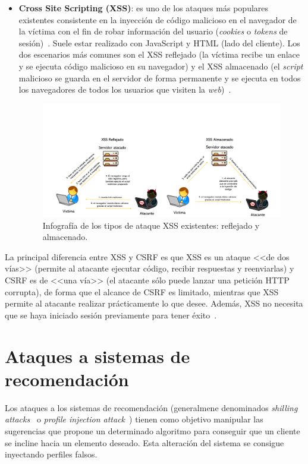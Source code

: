 \begin{itemize}
	\item \textbf{Cross Site Scripting (XSS)}: es uno de los ataques más populares existentes consistente en la inyección de código malicioso en el navegador de la víctima con el fin de robar información del usuario (\textit{cookies} o \textit{tokens} de sesión)~\cite{xssICM}. Suele estar realizado con JavaScript y HTML (lado del cliente). Los dos escenarios más comunes son el XSS reflejado (la víctima recibe un enlace y se ejecuta código malicioso en su navegador) y el XSS almacenado (el \textit{script} malicioso se guarda en el servidor de forma permanente y se ejecuta en todos los navegadores de todos los usuarios que visiten la \textit{web})~\cite{xssDibus}.
	
	\begin{figure}[h]
		\caption[Ataques \textit{web}: XSS]{Infografía de los tipos de ataque XSS existentes: reflejado y almacenado.}
		\label{img:xss}
		\centering
		\includegraphics[width=\textwidth]{../img/memoria/3_xss.pdf}
	\end{figure}
\end{itemize}

La principal diferencia entre XSS y CSRF es que XSS es un ataque <<de dos vías>> (permite al atacante ejecutar código, recibir respuestas y reenviarlas) y CSRF es de <<una vía>> (el atacante sólo puede lanzar una petición HTTP corrupta), de forma que el alcance de CSRF es limitado, mientras que XSS permite al atacante realizar prácticamente lo que desee. Además, XSS no necesita que se haya iniciado sesión previamente para tener éxito~\cite{xssVsCSRF}.

\section{Ataques a sistemas de recomendación}

Los ataques a los sistemas de recomendación (generalmene denominados \textit{shilling attacks}~\cite{mingdan2018ShillingAttacksAReview} o \textit{profile injection attack}~\cite{Mobasher2006Thesis}) tienen como objetivo manipular las sugerencias que propone un determinado algoritmo para conseguir que un cliente se incline hacia un elemento deseado. Esta alteración del sistema se consigue inyectando perfiles falsos.

